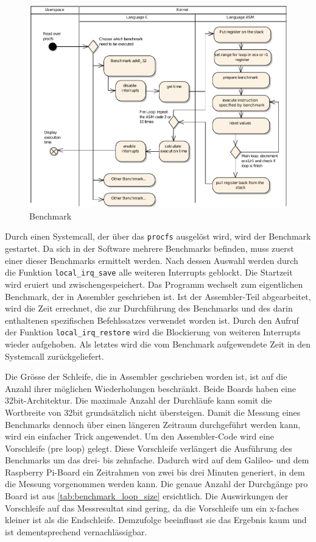 \begin{figure}[H]
\centering
\includegraphics[width=1.0\textwidth]{images/benchmark_ea.pdf}
\caption{Benchmark}
\label{fig:Benchmark}
\end{figure}


Durch einen Systemcall, der über das \texttt{procfs} ausgelöst wird, wird der Benchmark gestartet. Da sich in der Software mehrere Benchmarks befinden, muss zuerst einer dieser Benchmarks ermittelt werden. Nach dessen Auswahl werden durch die Funktion \texttt{local\_irq\_save} alle weiteren Interrupts geblockt. Die Startzeit wird eruiert und zwischengespeichert. Das Programm wechselt zum eigentlichen Benchmark, der in Assembler geschrieben ist. Ist der Assembler-Teil abgearbeitet, wird die Zeit errechnet, die zur Durchführung des Benchmarks und des darin enthaltenen spezifischen Befehlssatzes verwendet worden ist. Durch den Aufruf der Funktion \texttt{local\_irq\_restore} wird die Blockierung von weiteren Interrupts wieder aufgehoben. Als letztes wird die vom Benchmark aufgewendete Zeit in den Systemcall zurückgeliefert.
\par
Die Grösse der Schleife, die in Assembler geschrieben worden ist, ist auf die Anzahl ihrer möglichen Wiederholungen beschränkt. Beide Boards haben eine 32bit-Architektur. Die maximale Anzahl der Durchläufe kann somit die Wortbreite von 32bit grundsätzlich nicht übersteigen. Damit die Messung eines Benchmarks dennoch über einen längeren Zeitraum durchgeführt werden kann, wird ein einfacher Trick angewendet. Um den Assembler-Code wird eine Vorschleife (pre loop) gelegt. Diese Vorschleife verlängert die Ausführung des Benchmarks um das drei- bis zehnfache. Dadurch wird auf dem Galileo- und dem Raspberry Pi-Board ein Zeitrahmen von zwei bis drei Minuten generiert, in dem die Messung vorgenommen werden kann. Die genaue Anzahl der Durchgänge pro Board ist aus \autoref{tab:benchmark_loop_size} ersichtlich. Die Auswirkungen der Vorschleife auf das Messresultat sind gering, da die Vorschleife um ein x-faches kleiner ist als die Endschleife. Demzufolge beeinflusst sie das Ergebnis kaum und ist dementsprechend vernachlässigbar.

